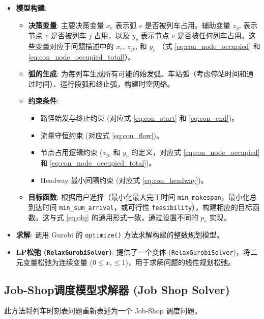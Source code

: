 \documentclass{article}
\begin{document}
\begin{itemize}
    \item \textbf{模型构建}:
        \begin{itemize}
            \item \textbf{决策变量}: 主要决策变量 $x_e$ 表示弧 $e$ 是否被列车占用。辅助变量
                $z_{jv}$ 表示节点 $v$ 是否被列车 $j$ 占用，以及 $y_v$
                表示节点 $v$ 是否被任何列车占用。这些变量对应于问题描述中的
                $x_e$, $z_{jv}$, 和 $y_v$ （式
                \ref{eq:con_node_occupied} 和 \ref{eq:con_node_occupied_total}）。
            \item \textbf{弧的生成}:
                为每列车生成所有可能的始发弧、车站弧（考虑停站时间和通过时间）、运行段弧和终止弧，构建时空网络。
            \item \textbf{约束条件}:
                \begin{itemize}
                    \item 路径始发与终止约束 (对应式 \ref{eq:con_start} 和
                        \ref{eq:con_end})。
                    \item 流量守恒约束 (对应式 \ref{eq:con_flow})。
                    \item 节点占用逻辑约束 ($z_{jv}$ 和 $y_v$ 的定义，对应式
                            \ref{eq:con_node_occupied} 和
                        \ref{eq:con_node_occupied_total})。
                    \item Headway 最小间隔约束 (对应式 \ref{eq:con_headway})。
                \end{itemize}
            \item \textbf{目标函数}: 根据用户选择（最小化最大完工时间
                \texttt{min\_makespan}，最小化总到达时间
                \texttt{min\_sum\_arrival}，或可行性
                \texttt{feasibility}），构建相应的目标函数。这与式 \ref{eq:obj}
                的通用形式一致，通过设置不同的 $p_e$ 实现。
        \end{itemize}
    \item \textbf{求解}: 调用 Gurobi 的 \texttt{optimize()} 方法求解构建的整数规划模型。
    \item \textbf{LP松弛 (\texttt{RelaxGurobiSolver})}: 提供了一个变体
        (\texttt{RelaxGurobiSolver})，将二元变量松弛为连续变量 ($0 \le x_e \le
        1$)，用于求解问题的线性规划松弛。
\end{itemize}

\subsection{Job-Shop调度模型求解器 (Job Shop Solver)}
此方法将列车时刻表问题重新表述为一个 Job-Shop 调度问题。
\end{document}
